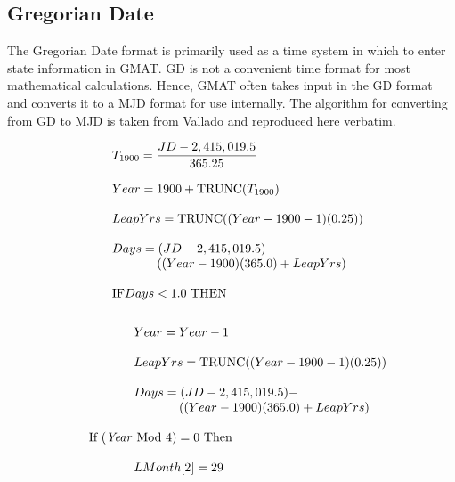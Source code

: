 \subsection{Gregorian Date}\label{Sec:GregorianDateFormat}

The Gregorian Date format is primarily used as a time system in
which to enter state information in GMAT.  GD is not a convenient
time format for most mathematical calculations.  Hence, GMAT often
takes input in the GD format and converts it to a MJD format for
use internally.  The algorithm for converting from GD to MJD is
taken from Vallado\cite{vallado2} and reproduced here verbatim.

\begin{equation}
\begin{array}{llll}
      & T_{1900} = \displaystyle\frac{JD - 2,415,019.5}{365.25}\\
      & \\
      & Year = 1900 + \mbox{TRUNC}(T_{1900}) \\
      & \\
      & LeapYrs = \mbox{TRUNC}((Year - 1900 - 1)(0.25))\\
      & \\
      & Days = (JD - 2,415,019.5) - \\
      & \hspace{.5 in}((Year - 1900)(365.0) +
               LeapYrs)\\
      & \\
      & \mbox{IF} Days < 1.0 \mbox{ THEN}
      \end{array}\nonumber
\end{equation}
%
\begin{equation}
     \begin{array}{llll}
      & \\
      & \hspace{.5 in} Year = Year - 1 \\
      &  \\
      & \hspace{.5 in} LeapYrs = \mbox{TRUNC}((Year - 1900 - 1)(0.25))\\
      & \\
      & \hspace{.5 in}Days = (JD - 2,415,019.5) - \\
      & \hspace{1 in}((Year - 1900)(365.0) +
               LeapYrs)\\
      & \\
      & \mbox{If (\emph{Year} Mod 4)} = 0 \mbox{ Then} \\
      & \\
      &  \hspace{.5 in} LMonth[2] = 29 \\
       \end{array}\nonumber
\end{equation}
